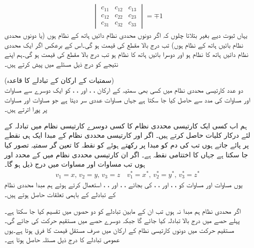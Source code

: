 \begin{align}\label{مساوات_الاحصاء_عددی_سر_شرط_ب}
\begin{vmatrix}
c_{11}&c_{12}&c_{13}\\
c_{12}&c_{22}&c_{23}\\
c_{31}&c_{32}&c_{33}
\end{vmatrix}=\mp 1
\end{align} 
 یہاں ثبوت دیے بغیر بتلاتا چلوں کہ اگر دونوں محددی نظام دائیں ہاتھ کے نظام ہوں (یا دونوں محددی نظام بائیں ہاتھ کے نظام ہوں) تب درج بالا مقطع کی قیمت  ہو گی۔اس کے برعکس اگر ایک محددی نظام دائیں ہاتھ کا نظام ہو اور دوسرا بائیں ہاتھ کا نظام ہو تب درج بالا مقطع کی قیمت  ہو گی۔ہم اپنے نتیجے کو درج ذیل مسئلے میں پیش کرتے ہیں۔

\quad (سمتیات کے ارکان کے تبادلے کا قاعدہ)\\
دو عدد کارتیسی محددی نظام میں کسی بھی سمتیہ  کے  ارکان ، ،  اور ، ،  کو ایک دوسرے سے مساوات  اور مساوات  کی مدد سے حاصل کیا جا سکتا ہے جہاں مساوات  عددی سر  دیتا ہے جو مساوات  اور مساوات  پر پورا اترتے ہیں۔ 

ہم اب کسی ایک کارتیسی محددی نظام کا کسی دوسرے کارتیسی نظام میں تبادلہ کے لئے درکار کلیات حاصل کرتے ہیں۔ اگر  اور  کارتیسی محددی نظام کے مبدا ایک ہی نقطے پر پائے جاتے ہوں تب  کی دم کو مبدا پر رکھتے ہوئے  کو نقطہ  کا تعین گر سمتیہ تصور کیا جا سکتا ہے جہاں  کا اختتامی نقطہ  ہے۔ اگر ان کارتیسی محددی نظام میں  کے محدد  اور  ہوں تب مساوات  اور مساوات  میں درج ذیل ہو گا۔
\begin{align*}
v_1=x, \, v_2=y,\, v_3=z\quad v_1^*=x^*,\, v_2^*=y^*,\, v_3^*=z^*
\end{align*}
یوں مساوات  اور مساوات  کو ، ،   اور 
، ،   کی بجائے ، ،  اور ، ،  استعمال کرتے ہوئے ہم مبدا محددی نظام کے تبادلے کے باہمی تعلقات حاصل ہوتے ہیں۔

اگر محددی نظام ہم مبدا نہ ہوں تب ان کے مابین تبادلے کو دو حصوں میں تقسیم کیا جا سکتا ہے۔پہلے حصے میں درج بالا تبادلہ کیا جائے گا جبکہ دوسرے حصے میں مستقیم حرکت  کی جائے گی۔ مستقیم حرکت میں دونوں کارتیسی نظام کے ارکان میں صرف مستقل قیمت کا فرق ہوتا ہے۔یوں عمومی تبادلے کا درج ذیل مسئلہ حاصل ہوتا ہے۔

